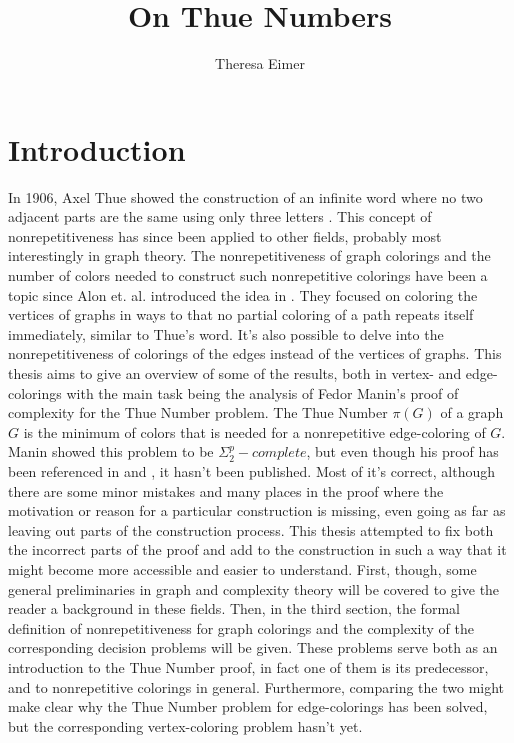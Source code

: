 \documentclass[12pt,a4paper]{article}
\author{Theresa Eimer}
\title{On Thue Numbers}
\date{}
\begin{document}
\renewcommand{\figurename}{Fig.}
%
\thispagestyle{empty}
\newpage
\tableofcontents
\thispagestyle{empty}
\newpage

\section{Introduction}
In 1906, Axel Thue showed the construction of an infinite word where no two adjacent parts are the same using only three letters \citep{Thue1906}. This concept of nonrepetitiveness has since been applied to other fields, probably most interestingly in graph theory. The nonrepetitiveness of graph colorings and the number of colors needed to construct such nonrepetitive colorings have been a topic since Alon et. al. introduced the idea in \citep{Alon2002}. They focused on coloring the vertices of graphs in ways to that no partial coloring of a path repeats itself immediately, similar to Thue's word. It's also possible to delve into the nonrepetitiveness of colorings of the edges instead of the vertices of graphs. This thesis aims to give an overview of some of the results, both in vertex- and edge-colorings with the main task being the analysis of Fedor Manin's proof of complexity for the Thue Number problem. The Thue Number $\pi(G)$ of a graph $G$ is the minimum of colors that is needed for a nonrepetitive edge-coloring of $G$. Manin showed this problem to be $\Sigma^p_2-complete$, but even though his proof has been referenced in \citep{Marx2009} and \citep{Schaefer2002}, it hasn't been published. Most of it's correct, although there are some minor mistakes and many places in the proof where the motivation or reason for a particular construction is missing, even going as far as leaving out parts of the construction process. This thesis attempted to fix both the incorrect parts of the proof and add to the construction in such a way that it might become more accessible and easier to understand.
\newline
First, though, some general preliminaries in graph and complexity theory will be covered to give the reader a background in these fields.
\newline
Then, in the third section, the formal definition of nonrepetitiveness for graph colorings and the complexity of the corresponding decision problems will be given. These problems serve both as an introduction to the Thue Number proof, in fact one of them is its predecessor, and to nonrepetitive colorings in general. Furthermore, comparing the two might make clear why the Thue Number problem for edge-colorings has been solved, but the corresponding vertex-coloring problem hasn't yet.
\end{document}

